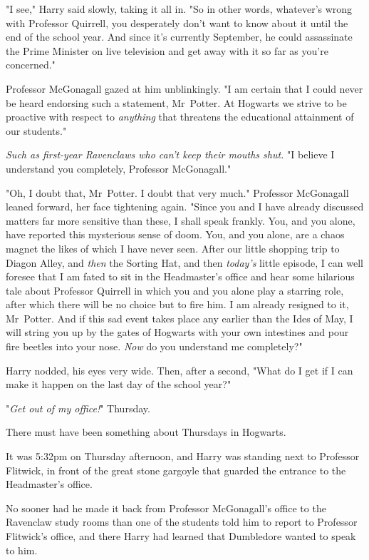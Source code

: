 "I see," Harry said slowly, taking it all in. "So in other words, whatever’s
wrong with Professor Quirrell, you desperately don’t want to know about it
until the end of the school year. And since it’s currently September, he could
assassinate the Prime Minister on live television and get away with it so far
as you’re concerned."

Professor McGonagall gazed at him unblinkingly. "I am certain that I could
never be heard endorsing such a statement, Mr~Potter. At Hogwarts we strive to
be proactive with respect to \emph{anything} that threatens the educational
attainment of our students."

\emph{Such as first-year Ravenclaws who can’t keep their mouths shut.} "I
believe I understand you completely, Professor McGonagall."

"Oh, I doubt that, Mr~Potter. I doubt that very much." Professor McGonagall
leaned forward, her face tightening again. "Since you and I have already
discussed matters far more sensitive than these, I shall speak frankly. You,
and you alone, have reported this mysterious sense of doom. You, and you alone,
are a chaos magnet the likes of which I have never seen. After our little
shopping trip to Diagon Alley, and \emph{then} the Sorting Hat, and then
\emph{today’s} little episode, I can well foresee that I am fated to sit in the
Headmaster’s office and hear some hilarious tale about Professor Quirrell in
which you and you alone play a starring role, after which there will be no
choice but to fire him. I am already resigned to it, Mr~Potter. And if this
sad event takes place any earlier than the Ides of May, I will string you up by
the gates of Hogwarts with your own intestines and pour fire beetles into your
nose. \emph{Now} do you understand me completely?"

Harry nodded, his eyes very wide. Then, after a second, "What do I get if I can
make it happen on the last day of the school year?"

"\emph{Get out of my office!}"
\later
Thursday.

There must have been something about Thursdays in Hogwarts.

It was 5:32pm on Thursday afternoon, and Harry was standing next to Professor
Flitwick, in front of the great stone gargoyle that guarded the entrance to the
Headmaster’s office.

No sooner had he made it back from Professor McGonagall’s office to the
Ravenclaw study rooms than one of the students told him to report to Professor
Flitwick’s office, and there Harry had learned that Dumbledore wanted to speak
to him.

